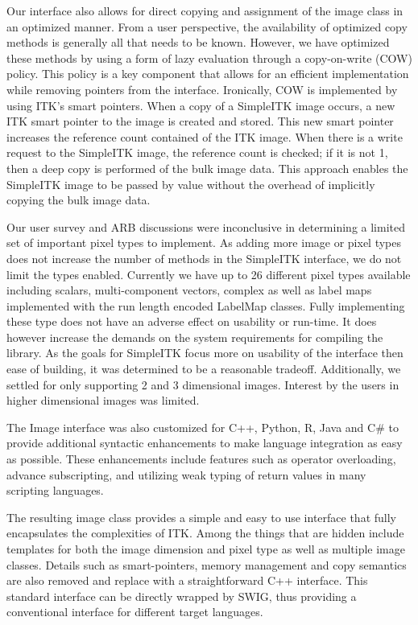 \documentclass{frontiersMED} %
\begin{document}
Our interface also allows for direct copying and assignment of the
image class in an optimized manner. From a user perspective, the
availability of optimized copy methods is generally all that needs to
be known. However, we have optimized these methods by using a form of
lazy evaluation through a copy-on-write (COW)  policy. This policy is
a key component that allows for an efficient implementation while
removing pointers from the interface. Ironically, COW is implemented
by using ITK's smart pointers. When a copy of a SimpleITK image
occurs, a new ITK smart pointer to the image is created and
stored. This new smart pointer increases the reference count contained
of the ITK image. When there is a write request to the SimpleITK
image, the reference count is checked; if it is not 1, then a deep
copy is performed of the bulk image data. This approach enables the
SimpleITK image to be passed by value without the overhead of
implicitly copying the bulk image data.

Our user survey and ARB discussions were inconclusive in determining a
limited set of important pixel types to implement. As adding more
image or pixel types does not increase the number of methods in the
SimpleITK interface, we do not limit the types enabled. Currently we
have up to 26 different pixel types available including scalars,
multi-component vectors, complex as well as label maps implemented
with the run length encoded LabelMap classes. Fully implementing these
type does not have an adverse effect on usability or run-time. It does
however increase the demands on the system requirements for compiling
the library. As the goals for SimpleITK focus more on usability of the
interface then ease of building, it was determined to be a reasonable
tradeoff. Additionally, we settled for only supporting 2 and 3
dimensional images. Interest by the users in higher dimensional images
was limited.

The Image interface was also customized for C++, Python, R, Java and C\# to
provide additional syntactic enhancements to make language integration
as easy as possible. These enhancements include features such as
operator overloading, advance subscripting, and utilizing weak typing
of return values in many scripting languages.

The resulting image class provides a simple and easy to use interface
that fully encapsulates the complexities of ITK. Among the things that
are hidden include templates for both the image dimension and pixel
type as well as multiple image classes. Details such as
smart-pointers, memory management and copy semantics are also removed
and replace with a straightforward C++ interface. This standard
interface can be directly wrapped by SWIG, thus providing a
conventional interface for different target languages.
\end{document}
